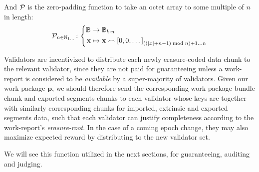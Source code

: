 And $\mathcal{P}_{}$ is the zero-padding function to take an octet array to some multiple of $n$ in length:
\begin{equation}\label{eq:zeropadding}
  \fnzeropad{n \in \Nclamp{1}{}}\colon\abracegroup{
    \blob &\to \blob[k \cdot n]\\
    \mathbf{x} &\mapsto \mathbf{x} \concat \sq{0, 0, \dots}\interval{((\len{x} + n - 1) \bmod n) + 1}{n}
  }
\end{equation}

Validators are incentivized to distribute each newly erasure-coded data chunk to the relevant validator, since they are not paid for guaranteeing unless a work-report is considered to be \emph{available} by a super-majority of validators. Given our work-package $\mathbf{p}$, we should therefore send the corresponding work-package bundle chunk and exported segments chunks to each validator whose keys are together with similarly corresponding chunks for imported, extrinsic and exported segments data, such that each validator can justify completeness according to the work-report's \emph{erasure-root}. In the case of a coming epoch change, they may also maximize expected reward by distributing to the new validator set.

We will see this function utilized in the next sections, for guaranteeing, auditing and judging.

\undef{\newavailabilityspecifier}
\undef{\itemtodigest}
\undef{\countupexports}
\undef{\importsegmentdata}
\undef{\pagedproofs}
\undef{\marshallrefine}
\undef{\extrinsicdata}
\undef{\segsX}
